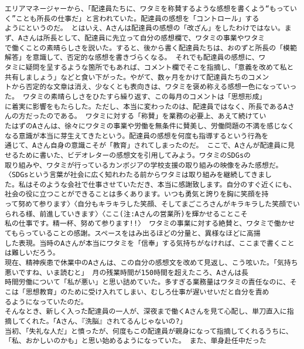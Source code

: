 \documentclass[11pt]{article}
\begin{document}
\begin{Verbatim}[commandchars=\\\{\}]
エリアマネージャーから、「配達員たちに、ワタミを称賛するような感想を書くよう“もっていく”ことも所長の仕事だ」と言われていた。配達員の感想を「コントロール」する
ようにというのだ。 とはいえ、Aさんは配達員の感想の「改ざん」をしたわけではない。まず、Aさんは所長として、配達員に先立って自分の感想欄で、ワタミの事業やワタミ
で働くことの素晴らしさを説いた。すると、後から書く配達員たちは、おのずと所長の「模範解答」を意識して、否定的な感想を書きづらくなる。 それでも配達員の感想に、ワ
タミに疑問を呈するような箇所でもあれば、コメント欄でそこを指摘し、「意義を改めて私と共有しましょう」などと食い下がった。やがて、数ヶ月をかけて配達員たちのコメン
トから否定的な文章は消え、少なくとも表向きは、ワタミを褒め称える感想一色になっていった。 ワタミの素晴らしさをひたすら繰り返す、この毎月のコメントは「思想形成」
に着実に影響をもたらした。ただし、本当に変わったのは、配達員ではなく、所長であるAさんの方だったのである。 ワタミに対する「称賛」を業務の必要上、あえて続けてい
たはずのAさんは、徐々にワタミの事業や労働を無条件に賛美し、労働問題の不満を感じなくなる意識が本当に芽生えてきたという。配達員の感想を何度も指導するという行為を
通じて、Aさん自身の意識こそが「教育」されてしまったのだ。 ここで、Aさんが配達員に見せるために書いた、ビデオレターの感想文を引用してみよう。ワタミのSDGsの
取り組みや、ワタミが行っているカンボジアの学校支援の取り組みの映像をみた感想だ。〈SDGsという言葉が社会に広く知れわたる前からワタミは取り組みを継続してきまし
た。私はそのような会社で仕事させていただき、本当に感謝致します。自分のすぐ近くにも、社会の役に立つことができることは多くあります。いつも勇気と誇りを胸に笑顔を持
って努めて参ります〉〈自分もキラキラした笑顔、そしてまごころさんがキラキラした笑顔でいられる様、前進していきます〉〈ここ(注:Aさんの営業所)を輝かせることこそ
私の仕事です。精一杯、努めて参ります!!〉 ワタミの事業に対する絶賛と、ワタミで働かせてもらっていることの感謝。スペースをはみ出るほどの分量と、異様なほどに高揚
した表現。当時のAさんが本当にワタミを「信奉」する気持ちがなければ、ここまで書くことは難しいだろう。
現在、精神疾患で休業中のAさんは、この自分の感想文を改めて見返し、こう呟いた。「気持ち悪いですね、いま読むと」 月の残業時間が150時間を超えたころ、Aさんは長
時間労働について「私が悪い」と思い詰めていた。多すぎる業務量はワタミの責任なのに、そこは「思想教育」のために受け入れてしまい、むしろ仕事が遅いせいだと自分を責め
るようになっていたのだ。
そんなとき、新しく入った配達員の一人が、深夜まで働くAさんを見て心配し、単刀直入に指摘してくれた。「Aさん、『洗脳』されてるんじゃないの?」
当初、「失礼な人だ」と憤ったが、何度もこの配達員が親身になって指摘してくれるうちに、「私、おかしいのかも」と思い始めるようになっていた。 また、単身赴任中だった

\end{Verbatim}
\end{document}
